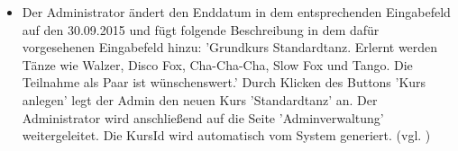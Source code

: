 \documentclass[a4paper]{scrreprt}
\begin{document}
\begin{itemize}
\begin{itemize}
						\item Der Administrator ändert den Enddatum in dem entsprechenden Eingabefeld auf den 30.09.2015 und fügt folgende Beschreibung in dem dafür vorgesehenen Eingabefeld hinzu: 'Grundkurs Standardtanz. Erlernt werden Tänze wie Walzer, Disco Fox, Cha-Cha-Cha, Slow Fox und Tango. Die Teilnahme als Paar ist wünschenswert.' Durch Klicken des Buttons 'Kurs anlegen' legt der Admin den neuen Kurs 'Standardtanz' an. Der Administrator wird anschließend auf die Seite 'Adminverwaltung' weitergeleitet. Die KursId wird automatisch vom System generiert. (vgl. ) 		
				 
					\end{itemize}
				 			
			\end{itemize}			
								
\end{document}
